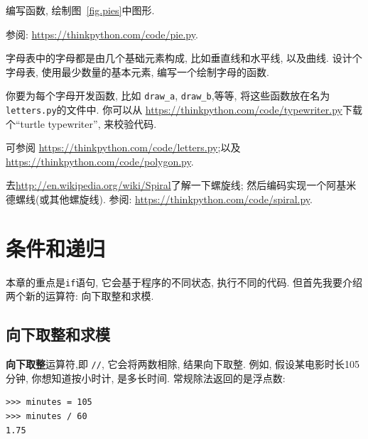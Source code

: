 \documentclass[10pt]{book}
\begin{document}
\begin{exercise}

编写函数, 绘制图~\ref{fig.pies}中图形. 

参阅: \url{https://thinkpython.com/code/pie.py}.

\end{exercise}

\begin{exercise}

字母表中的字母都是由几个基础元素构成, 比如垂直线和水平线, 以及曲线. 
设计个字母表, 使用最少数量的基本元素, 编写一个绘制字母的函数. 

你要为每个字母开发函数, 比如 \verb"draw_a", \verb"draw_b",等等, 
将这些函数放在名为{\tt letters.py}的文件中. 
你可以从 \url{https://thinkpython.com/code/typewriter.py}下载个``turtle typewriter'', 
来校验代码. 

可参阅 \url{https://thinkpython.com/code/letters.py};以及
\url{https://thinkpython.com/code/polygon.py}.

\end{exercise}

\begin{exercise}

去\url{http://en.wikipedia.org/wiki/Spiral}了解一下螺旋线;
然后编码实现一个阿基米德螺线(或其他螺旋线). 
参阅: \url{https://thinkpython.com/code/spiral.py}.

\end{exercise}


\chapter{条件和递归}

本章的重点是{\tt if}语句, 
它会基于程序的不同状态, 执行不同的代码. 
但首先我要介绍两个新的运算符: 向下取整和求模. 

\section{向下取整和求模}

{\bf 向下取整}运算符,即 \verb"//", 
它会将两数相除, 结果向下取整. 
例如, 假设某电影时长105分钟, 你想知道按小时计, 是多长时间. 
常规除法返回的是浮点数:

\begin{verbatim}
>>> minutes = 105
>>> minutes / 60
1.75
\end{verbatim}
\end{document}
